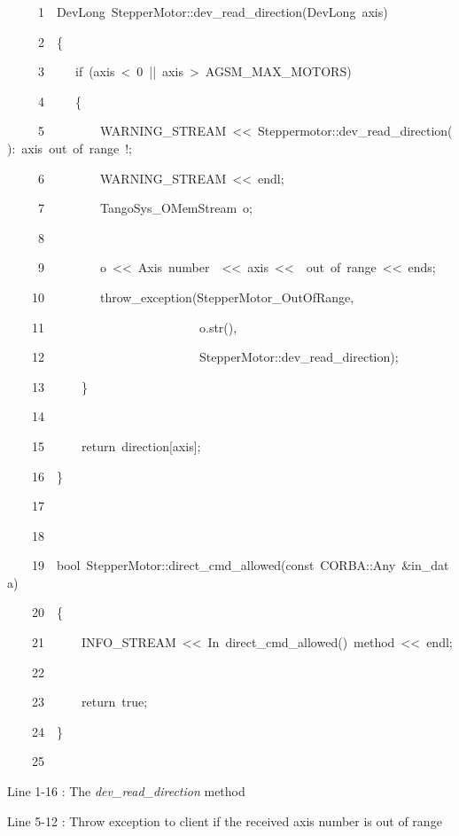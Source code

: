 
\begin{lyxcode}
~~~~~1~~DevLong~StepperMotor::dev\_read\_direction(DevLong~axis)

~~~~~2~~\{

~~~~~3~~~~~if~(axis~<~0~||~axis~>~AGSM\_MAX\_MOTORS)

~~~~~4~~~~~\{

~~~~~5~~~~~~~~~WARNING\_STREAM~<\textcompwordmark{}<~\textquotedbl{}Steppermotor::dev\_read\_direction():~axis~out~of~range~!\textquotedbl{};

~~~~~6~~~~~~~~~WARNING\_STREAM~<\textcompwordmark{}<~endl;

~~~~~7~~~~~~~~~TangoSys\_OMemStream~o;

~~~~~8~~~~~~~~~~~~~~~~~~

~~~~~9~~~~~~~~~o~<\textcompwordmark{}<~\textquotedbl{}Axis~number~\textquotedbl{}~<\textcompwordmark{}<~axis~<\textcompwordmark{}<~\textquotedbl{}~out~of~range\textquotedbl{}~<\textcompwordmark{}<~ends;

~~~~10~~~~~~~~~throw\_exception(\textquotedbl{}StepperMotor\_OutOfRange\textquotedbl{},

~~~~11~~~~~~~~~~~~~~~~~~~~~~~~~o.str(),

~~~~12~~~~~~~~~~~~~~~~~~~~~~~~~\textquotedbl{}StepperMotor::dev\_read\_direction\textquotedbl{});

~~~~13~~~~~~\}

~~~~14~~

~~~~15~~~~~~return~direction{[}axis{]};

~~~~16~~\}

~~~~17~~

~~~~18~~

~~~~19~~bool~StepperMotor::direct\_cmd\_allowed(const~CORBA::Any~\&in\_data)

~~~~20~~\{

~~~~21~~~~~~INFO\_STREAM~<\textcompwordmark{}<~\textquotedbl{}In~direct\_cmd\_allowed()~method\textquotedbl{}~<\textcompwordmark{}<~endl;

~~~~22~~~~~~~~~~

~~~~23~~~~~~return~true;

~~~~24~~\}

~~~~25~~
\end{lyxcode}


Line 1-16 : The \emph{dev\_read\_direction} method

Line 5-12 : Throw exception to client if the received axis number
is out of range

